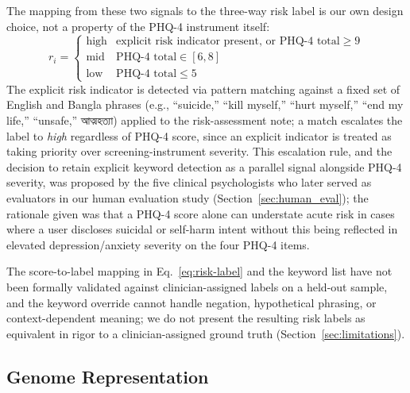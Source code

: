 \documentclass[mathematics,article,submit,xetex,moreauthors]{Definitions/mdpi}
\begin{document}
The mapping from these two signals to the three-way risk label is our own
design choice, not a property of the PHQ-4 instrument itself:
\begin{equation}
  \label{eq:risk-label}
  r_i =
  \begin{cases}
    \mathrm{high} & \text{explicit risk indicator present, or PHQ-4 total} \ge 9 \\
    \mathrm{mid}  & \text{PHQ-4 total} \in [6, 8] \\
    \mathrm{low}  & \text{PHQ-4 total} \le 5
  \end{cases}
\end{equation}
The explicit risk indicator is detected via pattern matching against a fixed
set of English and Bangla phrases (e.g., ``suicide,'' ``kill myself,''
``hurt myself,'' ``end my life,'' ``unsafe,'' {\bengalifont আত্মহত্যা}) applied
to the risk-assessment note; a match escalates the label to \emph{high}
regardless of PHQ-4 score, since an explicit indicator is treated as taking
priority over screening-instrument severity. This escalation rule, and the
decision to retain explicit keyword detection as a parallel signal alongside
PHQ-4 severity, was proposed by the five clinical psychologists who later
served as evaluators in our human evaluation study
(Section~\ref{sec:human_eval}); the rationale given was that a PHQ-4 score
alone can understate acute risk in cases where a user discloses suicidal or
self-harm intent without this being reflected in elevated depression/anxiety
severity on the four PHQ-4 items.

The score-to-label mapping in Eq.~\eqref{eq:risk-label} and the keyword
list have not been formally validated against clinician-assigned labels on
a held-out sample, and the keyword override cannot handle negation,
hypothetical phrasing, or context-dependent meaning; we do not present the
resulting risk labels as equivalent in rigor to a clinician-assigned
ground truth (Section~\ref{sec:limitations}).

\subsection{Genome Representation}
\label{sec:genome}
\end{document}

